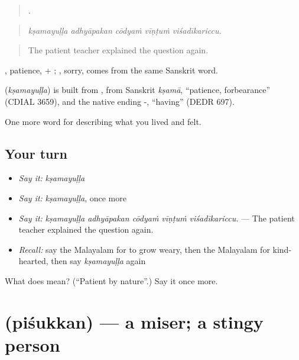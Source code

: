 \begin{quote}
    .
\end{quote}

\begin{quote}
\emph{kṣamayuḷḷa adhyāpakan cōdyaṁ vīṇṭuṁ viśadīkariccu.}
\end{quote}

\begin{quote}
The patient teacher explained the question again.
\end{quote}

, patience, + ; , sorry, comes from the same Sanskrit word.

\begin{cousinweb}
\textbf{} (\emph{kṣamayuḷḷa}) is built from , from Sanskrit \emph{kṣamā}, \textquotedblleft{}patience, forbearance\textquotedblright{} (CDIAL 3659), and the native ending -, \textquotedblleft{}having\textquotedblright{} (DEDR 697).
\end{cousinweb}

\begin{grammarlens}[title={What you've built}]
One more word for describing what you lived and felt.
\end{grammarlens}

\subsection*{Your turn}
\begin{itemize}
\raggedright
  \item \emph{Say it:} \emph{kṣamayuḷḷa}
  \item \emph{Say it:} \emph{kṣamayuḷḷa}, once more
  \item \emph{Say it:} \emph{kṣamayuḷḷa adhyāpakan cōdyaṁ vīṇṭuṁ viśadīkariccu.} — The patient teacher explained the question again.
  \item \emph{Recall:} say the Malayalam for to grow weary, then the Malayalam for kind-hearted, then say \emph{kṣamayuḷḷa} again
\end{itemize}

\begin{tcolorbox}[breakable,colback=teal!4,colframe=teal!35!black,title={Before you move on}]
What does  mean? (\textquotedblleft{}Patient by nature\textquotedblright{}.) Say it once more.
\end{tcolorbox}
\section[\texorpdfstring{\ml{പിശുക്കൻ} (piśukkan)}{പിശുക്കൻ (piśukkan)}]{ (piśukkan) — a miser; a stingy person}

